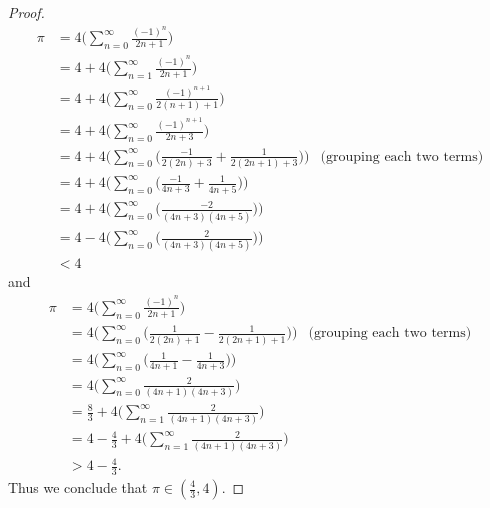 \begin{proof}
\begin{align*}
        \pi & = 4 \bigg(\sum_{n = 0}^\infty \frac{(-1)^n}{2n + 1}\bigg)                                                                             \\
            & = 4 + 4 \bigg(\sum_{n = 1}^\infty \frac{(-1)^n}{2n + 1}\bigg)                                                                         \\
            & = 4 + 4 \bigg(\sum_{n = 0}^\infty \frac{(-1)^{n + 1}}{2(n + 1) + 1}\bigg)                                                             \\
            & = 4 + 4 \bigg(\sum_{n = 0}^\infty \frac{(-1)^{n + 1}}{2n + 3}\bigg)                                                                   \\
            & = 4 + 4 \Bigg(\sum_{n = 0}^\infty \bigg(\frac{-1}{2(2n) + 3} + \frac{1}{2(2n + 1) + 3}\bigg)\Bigg) & \text{(grouping each two terms)} \\
            & = 4 + 4 \Bigg(\sum_{n = 0}^\infty \bigg(\frac{-1}{4n + 3} + \frac{1}{4n + 5}\bigg)\Bigg)                                              \\
            & = 4 + 4 \Bigg(\sum_{n = 0}^\infty \bigg(\frac{-2}{(4n + 3)(4n + 5)}\bigg)\Bigg)                                                       \\
            & = 4 - 4 \Bigg(\sum_{n = 0}^\infty \bigg(\frac{2}{(4n + 3)(4n + 5)}\bigg)\Bigg)                                                        \\
            & < 4
    \end{align*}
    and
    \begin{align*}
        \pi & = 4 \bigg(\sum_{n = 0}^\infty \frac{(-1)^n}{2n + 1}\bigg)                                                                        \\
            & = 4 \Bigg(\sum_{n = 0}^\infty \bigg(\frac{1}{2(2n) + 1} - \frac{1}{2(2n + 1) + 1}\bigg)\Bigg) & \text{(grouping each two terms)} \\
            & = 4 \Bigg(\sum_{n = 0}^\infty \bigg(\frac{1}{4n + 1} - \frac{1}{4n + 3}\bigg)\Bigg)                                              \\
            & = 4 \bigg(\sum_{n = 0}^\infty \frac{2}{(4n + 1)(4n + 3)}\bigg)                                                                   \\
            & = \frac{8}{3} + 4 \bigg(\sum_{n = 1}^\infty \frac{2}{(4n + 1)(4n + 3)}\bigg)                                                     \\
            & = 4 - \frac{4}{3} + 4 \bigg(\sum_{n = 1}^\infty \frac{2}{(4n + 1)(4n + 3)}\bigg)                                                 \\
            & > 4 - \frac{4}{3}.
    \end{align*}
    Thus we conclude that \(\pi \in (\frac{4}{3}, 4)\).
\end{proof}

